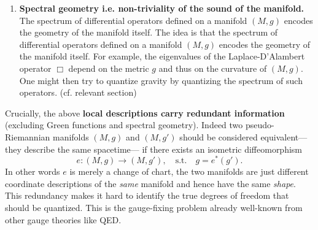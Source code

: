 \documentclass[../geometry_main.tex]{subfiles}
\begin{document}
\begin{mytheorem}
\begin{enumerate}
For example, the 2-point function of a free scalar field theory on a curved manifold \((M,g)\) satisfies
\begin{equation}
    (\Box_x + m^2) G(x,y) = - \frac{1}{\sqrt{|g|}} \delta^{(n)} (x-y),
\end{equation}
where \(\Box\) is the D'Alambert operator associated to the metric \(g\).
From the knowledge of the Green function \(G(x,y)\) for all pairs of points \((x,y) \in M \times M\), one might try to reconstruct the metric \(g\) and thus the curvature of the manifold. 
In doing so, quantization conditions on $g$ might emerge naturally from the quantum nature of the field theory itself.
%
\item \textbf{Spectral geometry i.e. non-triviality of the sound of the manifold.}  The spectrum of differential operators defined on a manifold \((M,g)\) encodes the geometry of the manifold itself.
The idea is that the spectrum of differential operators defined on a manifold \((M,g)\) encodes the geometry of the manifold itself.
For example, the eigenvalues of the Laplace-D'Alambert operator \(\Box\) depend on the metric \(g\) and thus on the curvature of \((M,g)\).
One might then try to quantize gravity by quantizing the spectrum of such operators. (cf. relevant section) 
\end{enumerate}
%
Crucially, the above \textbf{local descriptions carry redundant information}  (excluding Green functions and spectral geometry).
Indeed two pseudo-Riemannian manifolds \((M,g)\) and \((M,g')\) should be considered equivalent— they describe the same spacetime— if there exists an isometric diffeomorphism
\[
e:(M,g)\longrightarrow (M,g'), \quad \text{s.t.}\quad g = e^*(g').
\]
In other words \(e\) is merely a change of chart, the two manifolds are just different coordinate descriptions of the \emph{same} manifold and hence have the same \emph{shape}.
This redundancy makes it hard to identify the true degrees of freedom that should be quantized.
This is the gauge-fixing problem already well-known from other gauge theories like QED.
%
\end{mytheorem}
\end{document}
